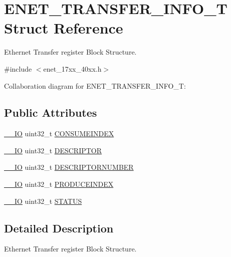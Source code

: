 \hypertarget{structENET__TRANSFER__INFO__T}{}\section{E\+N\+E\+T\+\_\+\+T\+R\+A\+N\+S\+F\+E\+R\+\_\+\+I\+N\+F\+O\+\_\+T Struct Reference}
\label{structENET__TRANSFER__INFO__T}


Ethernet Transfer register Block Structure.  




{\ttfamily \#include $<$enet\+\_\+17xx\+\_\+40xx.\+h$>$}



Collaboration diagram for E\+N\+E\+T\+\_\+\+T\+R\+A\+N\+S\+F\+E\+R\+\_\+\+I\+N\+F\+O\+\_\+T\+:
\subsection*{Public Attributes}
\begin{DoxyCompactItemize}
\item 
\hyperlink{core__cm3_8h_aec43007d9998a0a0e01faede4133d6be}{\+\_\+\+\_\+\+IO} uint32\+\_\+t \hyperlink{structENET__TRANSFER__INFO__T_a1704aa8577f168e0bb3565f68766e27c}{C\+O\+N\+S\+U\+M\+E\+I\+N\+D\+EX}
\item 
\hyperlink{core__cm3_8h_aec43007d9998a0a0e01faede4133d6be}{\+\_\+\+\_\+\+IO} uint32\+\_\+t \hyperlink{structENET__TRANSFER__INFO__T_a9eabd8ba19da27477fd1a07efe01161e}{D\+E\+S\+C\+R\+I\+P\+T\+OR}
\item 
\hyperlink{core__cm3_8h_aec43007d9998a0a0e01faede4133d6be}{\+\_\+\+\_\+\+IO} uint32\+\_\+t \hyperlink{structENET__TRANSFER__INFO__T_a5ee3c6f15d43d48fe6de2e52faa66610}{D\+E\+S\+C\+R\+I\+P\+T\+O\+R\+N\+U\+M\+B\+ER}
\item 
\hyperlink{core__cm3_8h_aec43007d9998a0a0e01faede4133d6be}{\+\_\+\+\_\+\+IO} uint32\+\_\+t \hyperlink{structENET__TRANSFER__INFO__T_ab8f942719d586cb8d735dbe57341bc10}{P\+R\+O\+D\+U\+C\+E\+I\+N\+D\+EX}
\item 
\hyperlink{core__cm3_8h_aec43007d9998a0a0e01faede4133d6be}{\+\_\+\+\_\+\+IO} uint32\+\_\+t \hyperlink{structENET__TRANSFER__INFO__T_ae72bffa37688d592667997f276ff28e2}{S\+T\+A\+T\+US}
\end{DoxyCompactItemize}


\subsection{Detailed Description}
Ethernet Transfer register Block Structure. 


